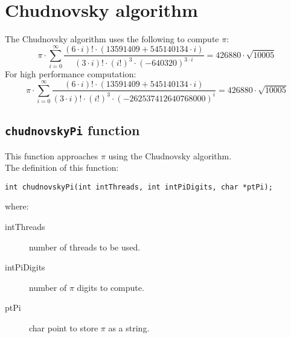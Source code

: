 
\section{Chudnovsky algorithm}

The Chudnovsky algorithm uses the following to compute $\pi$:
%
\begin{displaymath}
\pi \cdot \sum_{i=0}^{\infty} \frac{(6\cdot i)!\cdot(13591409 + 545140134 \cdot i)}{(3\cdot i)!\cdot(i!)^3\cdot (-640320)^{3\cdot i}}  = 426880 \cdot \sqrt{10005}
\end{displaymath}
%
For high performance computation:
%
\begin{displaymath}
\pi \cdot \sum_{i=0}^{\infty} \frac{(6\cdot i)!\cdot(13591409 + 545140134 \cdot i)}{(3\cdot i)!\cdot(i!)^3\cdot (-262537412640768000)^{i}}  = 426880 \cdot \sqrt{10005}
\end{displaymath}
%

\subsection{\texttt{chudnovskyPi} function}

This function approaches $\pi$ using the Chudnovsky algorithm.\\

The definition of this function:
%
\begin{verbatim}
int chudnovskyPi(int intThreads, int intPiDigits, char *ptPi);  
\end{verbatim}
%
where:
%
\begin{description}
\item[intThreads] number of threads to be used.
\item[intPiDigits] number of $\pi$ digits to compute.
\item[ptPi] char point to store $\pi$ as a string.
\end{description}



